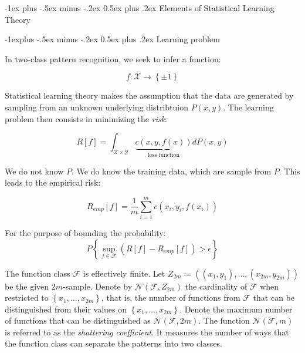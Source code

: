 \documentclass[10pt,landscape]{article}
\makeatletter
\renewcommand{\section}{\@startsection{section}{1}{0mm}%
                                {-1ex plus -.5ex minus -.2ex}%
                                {0.5ex plus .2ex}%
                                {\normalfont\large\bfseries}}
\renewcommand{\subsection}{\@startsection{subsection}{2}{0mm}%
                                {-1explus -.5ex minus -.2ex}%
                                {0.5ex plus .2ex}%
                                {\normalfont\normalsize\bfseries}}
\makeatother
\begin{document}
\begin{multicols}{3}
\section{Elements of Statistical Learning Theory}

\subsection{Learning problem}

In two-class pattern recognition, we seek to infer a function:

\begin{equation*}
f : \mathcal{X} \rightarrow \left\lbrace \pm 1 \right\rbrace
\end{equation*}

Statistical learning theory makes the assumption that the data are generated by sampling from an unknown underlying distribtuion $P(x,y)$. The learning problem then consists in minimizing the \textit{risk}:

\begin{equation*}
R \left[ f \right] = \int_{\mathcal{X} \times \mathcal{Y}} \underbrace{c\left(x,y,f(x)\right)}_{\textrm{loss function}} dP(x,y)
\end{equation*}

We do not know $P$. We do know the training data, which are sample from $P$. This leads to the empirical risk:

\begin{equation*}
R_{emp} \left[ f \right] = \frac{1}{m}\sum_{i=1}^{m} c(x_i,y_i,f(x_i))
\end{equation*}

For the purpose of bounding the probability:
\begin{equation*}
P \left\lbrace \sup_{f \in \mathcal{F}} \left( R \left[ f \right] - R_{emp} \left[ f \right] \right) > \epsilon \right\rbrace
\end{equation*}

The function class $\mathcal{F}$ is effectively finite. Let $Z_{2m} \coloneqq \left( \left( x_1, y_1 \right), \dots, \left(x_{2m}, y_{2m} \right) \right)$ be the given $2m$-sample. Denote by $\mathcal{N} \left( \mathcal{F}, Z_{2m} \right)$ the cardinality of $\mathcal{F}$ when restricted to $\left\lbrace x_1, \dots, x_{2m} \right\rbrace$, that is, the number of functions from $\mathcal{F}$ that can be distinguished from their values on $\left\lbrace x_1, \dots, x_{2m} \right\rbrace$. Denote the maximum number of functions that can be distinguished as $\mathcal{N} \left( \mathcal{F}, 2m \right)$. The function $\mathcal{N} \left( \mathcal{F}, m \right)$ is referred to as the \textit{shattering coefficient}. It measures the number of ways that the function class can separate the patterns into two classes. 


\end{multicols}
\end{document}
